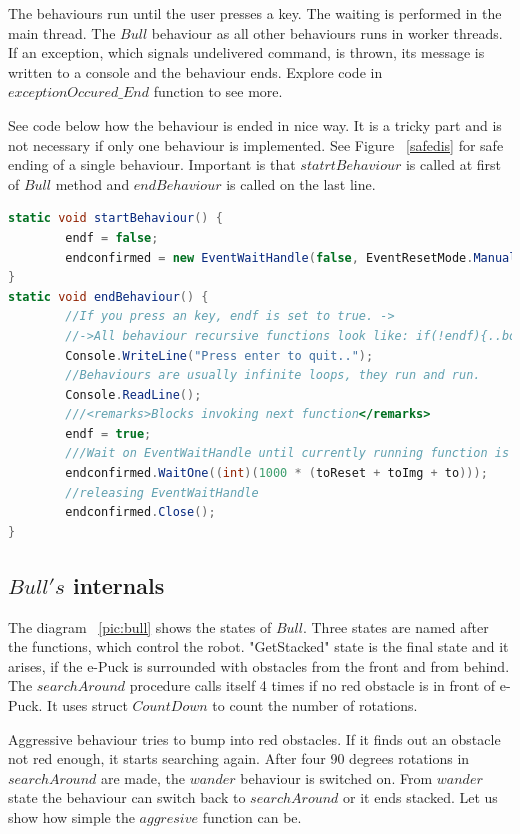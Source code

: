 \documentclass[12pt,notitlepage]{report}
\begin{document}
	The behaviours run until the user presses a key. The waiting is performed in the main thread. 
	The $Bull$ behaviour as all other behaviours runs in worker threads.
	If an exception, which signals undelivered command, is thrown, 
	its message is written to a console and the behaviour ends. 
	Explore code in $exceptionOccured\_End$ function to see more.

	See code below how the behaviour is ended in nice way. 
	It is a tricky part and is not necessary if only one behaviour is implemented. See Figure ~\ref{safedis}
	for safe ending of a single behaviour.
	Important is that $statrtBehaviour$ is called at first of $Bull$ method and $endBehaviour$ is called on the last line.
\begin{lstlisting}[language=cs]
static void startBehaviour() {
        endf = false;
        endconfirmed = new EventWaitHandle(false, EventResetMode.ManualReset);
}
static void endBehaviour() {        
        //If you press an key, endf is set to true. ->
        //->All behaviour recursive functions look like: if(!endf){..body..}else endconfirmed.Set();
        Console.WriteLine("Press enter to quit..");
        //Behaviours are usually infinite loops, they run and run.
        Console.ReadLine();
        ///<remarks>Blocks invoking next function</remarks>
        endf = true;
        ///Wait on EventWaitHandle until currently running function is finished.
        endconfirmed.WaitOne((int)(1000 * (toReset + toImg + to)));
        //releasing EventWaitHandle
        endconfirmed.Close();
}
\end{lstlisting}

\subsection{$Bull's$ internals} \label{bull}
	The diagram ~\ref{pic:bull} shows the states of $Bull$.
	Three states are named after the functions, which control the robot. "GetStacked" state
	is the final state and it arises, if the e-Puck is surrounded with obstacles from the front and from behind.
	The $searchAround$ procedure calls itself 4 times if no red obstacle is in front of e-Puck.
	It uses struct $CountDown$ to count the number of rotations.

	Aggressive behaviour tries to bump into red obstacles. If it finds out an obstacle not red enough, it
	starts searching again. After four 90 degrees rotations in $searchAround$ are made, 
	the $wander$ behaviour is switched on. From $wander$ state the behaviour 
	can switch back to $searchAround$ or it  ends stacked.
	Let us show how simple the $aggresive$ function can be.
\end{document}
